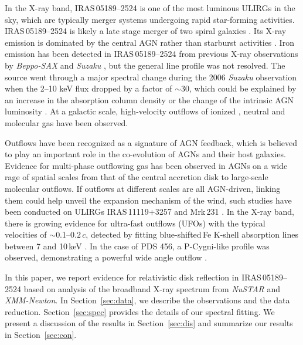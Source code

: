 \documentclass[]{emulateapj}
\def \nustar {{\em NuSTAR }}
\def \suzaku {{\em Suzaku }}
\def \sax {{\em Beppo-SAX }}
\def \iras {{IRAS\,05189--2524 }}
\begin{document}
In the X-ray band, \iras is one of the most luminous ULIRGs in the sky, which are typically merger systems undergoing rapid star-forming activities. \iras is likely a late stage merger of two spiral galaxies \citep{san88}. Its X-ray emission is dominated by the central AGN rather than starburst activities \citep{vei99b}. Iron emission has been detected in \iras from previous X-ray observations by \sax \citep{sev01} and \suzaku \citep{ten09}, but the general line profile was not resolved. The source went through a major spectral change during the 2006 \suzaku observation when the 2--10 keV flux dropped by a factor of $\sim$30, which could be explained by an increase in the absorption column density or the change of the intrinsic AGN luminosity \citep{ten09}. At a galactic scale, high-velocity outflows of ionized \citep{wes12, bel13}, neutral \citep{rup05, ten13, rup15} and molecular \citep{vei13} gas have been observed.

Outflows have been recognized as a signature of AGN feedback, which is believed to play an important role in the co-evolution of AGNs and their host galaxies. Evidence for multi-phase outflowing gas has been observed in AGNs on a wide rage of spatial scales from that of the central accretion disk to large-scale molecular outflows. If outflows at different scales are all AGN-driven, linking them could help unveil the expansion mechanism of the wind, such studies have been conducted on ULIRGs IRAS\,11119+3257 \citep{tom15} and Mrk\,231 \citep{fer15}. In the X-ray band, there is growing evidence for ultra-fast outflows (UFOs) with the typical velocities of $\sim$0.1--$0.2\,c$, detected by fitting blue-shifted\,Fe K-shell absorption lines between 7 and 10\,keV \citep[e.g.,][]{pou03, tom10, pou13}. In the case of PDS 456, a P-Cygni-like profile was observed, demonstrating a powerful wide angle outflow \citep{nar15}.

In this paper, we report evidence for relativistic disk reflection in \iras based on analysis of the broadband X-ray spectrum from \nustar and {\em XMM-Newton}. In Section~\ref{sec:data}, we describe the observations and the data reduction. Section~\ref{sec:spec} provides the details of our spectral fitting. We present a discussion of the results in Section~\ref{sec:dis} and summarize our results in Section~\ref{sec:con}.

\end{document}
